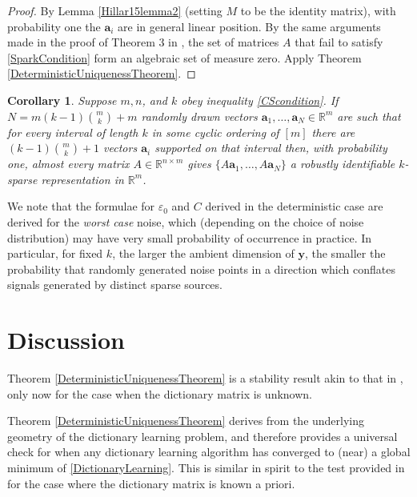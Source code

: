 \documentclass[journal, onecolumn]{IEEEtran}
\newtheorem{corollary}{Corollary}
\begin{document}
\begin{proof}
By Lemma \ref{Hillar15lemma2} (setting $M$ to be the identity matrix), with probability one the $\mathbf{a}_i$ are in general linear position. By the same arguments made in the proof of Theorem 3 in \cite{Hillar15}, the set of matrices $A$ that fail to satisfy \eqref{SparkCondition} form an algebraic set of measure zero. Apply Theorem \ref{DeterministicUniquenessTheorem}.
\end{proof}

\begin{corollary}
Suppose $m, n$, and $k$ obey inequality \eqref{CScondition}.  If $N = m(k-1){m \choose k}+m$ randomly drawn vectors $\mathbf{a}_1, \ldots, \mathbf{a}_N \in \mathbb{R}^m$ are such that for every interval of length $k$ in some cyclic ordering of $[m]$ there are $(k-1){m \choose k}+1$ vectors $\mathbf{a}_i$ supported on that interval then, with probability one, almost every matrix $A \in \mathbb{R}^{n \times m}$ gives $\{A\mathbf{a}_1, \ldots , A\mathbf{a}_N \}$ a robustly identifiable $k$-sparse representation in $\mathbb{R}^m$.
\end{corollary}

We note that the formulae for $\varepsilon_0$ and $C$ derived in the deterministic case are derived for the \emph{worst case} noise, which (depending on the choice of noise distribution) may have very small probability of occurrence in practice. In particular, for fixed $k$, the larger the ambient dimension of $\mathbf{y}$, the smaller the probability that randomly generated noise points in a direction which conflates signals generated by distinct sparse sources. 


\section{Discussion}

Theorem \eqref{DeterministicUniquenessTheorem} is a stability result akin to that in \cite{donoho2006stable}, only now for the case when the dictionary matrix is unknown.

Theorem \eqref{DeterministicUniquenessTheorem} derives from the underlying geometry of the dictionary learning problem, and therefore provides a universal check for when any dictionary learning algorithm has converged to (near) a global minimum of \eqref{DictionaryLearning}. This is similar in spirit to the test provided in \cite{gribonval2006simple} for the case where the dictionary matrix is known a priori. 
	
\end{document}
